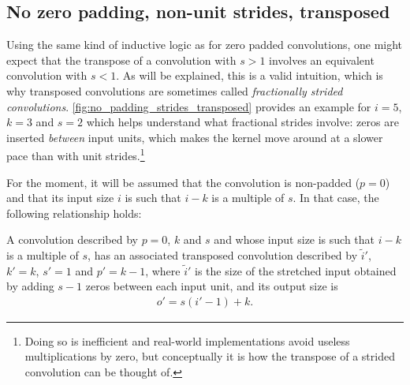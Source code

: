 \subsection{No zero padding, non-unit strides, transposed}

Using the same kind of inductive logic as for zero padded convolutions, one
might expect that the transpose of a convolution with $s > 1$ involves an
equivalent convolution with $s < 1$. As will be explained, this is a valid
intuition, which is why transposed convolutions are sometimes called {\em
fractionally strided convolutions}.
\autoref{fig:no_padding_strides_transposed} provides an example for $i = 5$, $k
= 3$ and $s = 2$ which helps understand what fractional strides involve: zeros
are inserted {\em between\/} input units, which makes the kernel move around at
a slower pace than with unit strides.\footnote{Doing so is inefficient and
    real-world implementations avoid useless multiplications by zero, but
    conceptually it is how the transpose of a strided convolution can be
    thought of.}

For the moment, it will be assumed that the convolution is non-padded ($p = 0$)
and that its input size $i$ is such that $i - k$ is a multiple of $s$. In that
case, the following relationship holds:

\begin{relationship}\label{rel:no_padding_strides_transposed}
A convolution described by $p = 0$, $k$ and $s$ and whose input
size is such that $i - k$ is a multiple of $s$, has an associated transposed
convolution described by $\tilde{i}'$, $k' = k$, $s' = 1$ and $p' = k - 1$,
where $\tilde{i}'$ is the size of the stretched input obtained by adding
$s - 1$ zeros between each input unit, and its output size is
\begin{equation*}
\begin{split}
    o' = s (i' - 1) + k.
\end{split}
\end{equation*}
\end{relationship}

